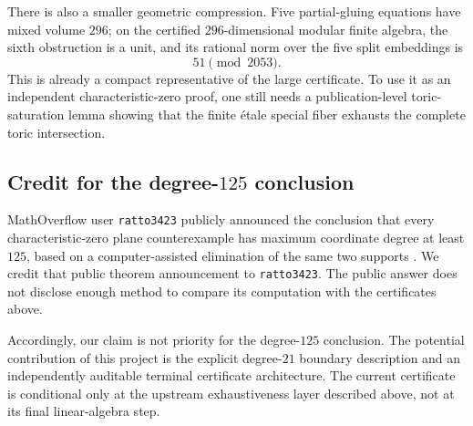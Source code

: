 There is also a smaller geometric compression.  Five partial-gluing
equations have mixed volume \(296\); on the certified
\(296\)-dimensional modular finite algebra, the sixth obstruction is a unit,
and its rational norm over the five split embeddings is
\[
51\pmod{2053}.
\]
This is already a compact representative of the large certificate.  To use
it as an independent characteristic-zero proof, one still needs a
publication-level toric-saturation lemma showing that the finite \'{e}tale
special fiber exhausts the complete toric intersection.

\subsection{Credit for the degree-\(125\) conclusion}

MathOverflow user \texttt{ratto3423} publicly announced the conclusion that
every characteristic-zero plane counterexample has maximum coordinate degree
at least \(125\), based on a computer-assisted elimination of the same two
supports \cite{ratto3423degree125}.  We credit that public theorem
announcement to \texttt{ratto3423}.  The public answer does not disclose
enough method to compare its computation with the certificates above.

Accordingly, our claim is not priority for the degree-\(125\) conclusion.
The potential contribution of this project is the explicit degree-\(21\)
boundary description and an independently auditable terminal certificate
architecture.  The current certificate is conditional only at the upstream
exhaustiveness layer described above, not at its final linear-algebra step.
